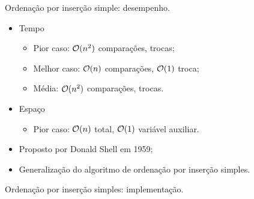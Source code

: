 \begin{frame}{Ordenação por inserção simple: desempenho.}

  \begin{itemize}
  \item Tempo
    \begin{itemize}
    \item Pior caso: $\mathcal{O}(n^2)$ comparações, trocas;
    \item Melhor caso: $\mathcal{O}(n)$ comparações, $\mathcal{O}(1)$ troca;
    \item Média: $\mathcal{O}(n^2)$ comparações, trocas.
    \end{itemize}
  \item Espaço
    \begin{itemize}
    \item Pior caso: $\mathcal{O}(n)$ total, $\mathcal{O}(1)$ variável auxiliar.
    \end{itemize}
  \end{itemize}
\end{frame}


\begin{frame}{\insertlecture}
  \begin{itemize}
  \item Proposto por Donald Shell em 1959;
  \item Generalização do algoritmo de ordenação por inserção simples.
  \end{itemize}
\end{frame}

\begin{frame}{Ordenação por inserção simples: implementação.}
  
\end{frame}


